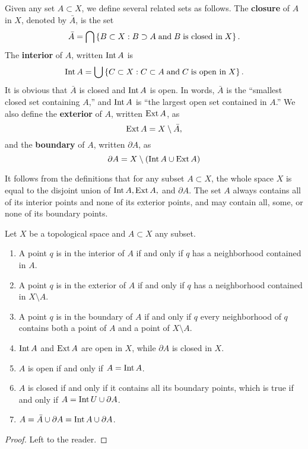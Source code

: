 \documentclass{mathnotes}
\begin{document}
\begin{defn}
    Given any set $A\subset X$, we define several related sets as follows. The \textbf{closure} of $A$ in $X$, denoted by $\bar{A}$,
    is the set
    \[\bar{A}=\bigcap\left\{ B\subset X:B\supset A \;\textnormal{and}\; B \;\textnormal{is closed in}\; X \right\}.\]
    The \textbf{interior} of $A$, written $\operatorname{Int} A$ is
    \[\operatorname{Int} A=\bigcup \left\{ C\subset X:C\subset A \;\textnormal{and}\; C \;\textnormal{is open in}\; X \right\}.\]
    It is obvious that $\bar{A}$ is closed and $\operatorname{Int} A$ is open. In words, $\bar{A}$ is the ``smallest closed set containing $A$,''
    and $\operatorname{Int} A$ is ``the largest open set contained in $A$.''
    We also define the \textbf{exterior} of $A$, written $\operatorname{Ext} A$, as
    \[\operatorname{Ext} A=X\setminus \bar{A},\]
    and the \textbf{boundary} of $A$, written $\partial A$, as
    \[\partial A=X\setminus\left( \operatorname{Int} A \cup \operatorname{Ext} A \right)\]
\end{defn}

It follows from the definitions that for any subset $A\subset X$, the whole space $X$ is equal to the disjoint union of $\operatorname{Int} A, \operatorname{Ext} A,$
and $\partial A$. The set $A$ always contains all of its interior points and none of its exterior points, and may contain all, some, or none
of its boundary points.

\begin{lem}
    Let $X$ be a topological space and $A\subset X$ any subset.
    \begin{enumerate}
        \item A point $q$ is in the interior of $A$ if and only if $q$ has a neighborhood contained in $A$.
        \item A point $q$ is in the exterior of $A$ if and only if $q$ has a neighborhood contained in $X\setminus A$.
        \item A point $q$ is in the boundary of $A$ if and only if $q$ every neighborhood of $q$ contains both a point of
            $A$ and a point of $X\setminus A$.
        \item $\operatorname{Int} A$ and $\operatorname{Ext} A$ are open in $X$, while $\partial A$ is closed in $X$.
        \item $A$ is open if and only if $A=\operatorname{Int} A$.
        \item $A$ is closed if and only if it contains all its boundary points, which is true if and only if $A=\operatorname{Int} U\cup\partial A$.
        \item $A=\bar{A}\cup\partial A=\operatorname{Int} A\cup\partial A$.
    \end{enumerate}
\end{lem}
\begin{proof}
    Left to the reader.
\end{proof}
\end{document}

